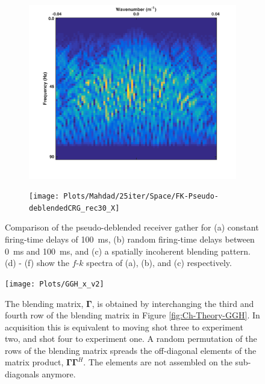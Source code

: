 \begin{figure}
\begin{subfigure}[b]{0.3\textwidth}
	\end{subfigure}
	\centering
	\begin{subfigure}[b]{0.3\textwidth}
		\centering
		\includegraphics[width = \textwidth]{Plots/Mahdad/25iter/TimeDelay/FK-Pseudo-deblendedCRG_rec30}
		\caption{}
		\label{fig:Ch-Theory-PseudoCRG-FK-IncoherentDelay}
	\end{subfigure}
	\centering
	\begin{subfigure}[b]{0.3\textwidth}
		\centering
		\texttt{[image: Plots/Mahdad/25iter/Space/FK-Pseudo-deblendedCRG\_rec30\_X]}
		\caption{}
		\label{fig:Ch-Theory-PseudoCRG-FK-IncoherentSpace}
	\end{subfigure}
	
	\caption{Comparison of the pseudo-deblended receiver gather for (a) constant firing-time delays of \SI{100}{\milli\second}, (b) random firing-time delays between \SI{0}{\milli\second} and \SI{100}{\milli\second}, and (c) a spatially incoherent blending pattern. (d) - (f) show the $f$-$k$ spectra of (a), (b), and (c) respectively.}
	\label{fig:Ch-Theory-PseudoCRG-IncoherencyEffect}

\end{figure}

\begin{figure}
	\centering
	\texttt{[image: Plots/GGH\_x\_v2]}
	\caption{The blending matrix, $\mathbf{\Gamma}$, is obtained by interchanging the third and fourth row of the blending matrix in Figure \ref{fig:Ch-Theory-GGH}. In acquisition this is equivalent to moving shot three to experiment two, and shot four to experiment one. A random permutation of the rows of the blending matrix spreads the off-diagonal elements of the matrix product, $\mathbf{\Gamma\Gamma}^H$. The elements are not assembled on the sub-diagonals anymore.}
	\label{fig:Ch-Theory-GGHx}
\end{figure}

